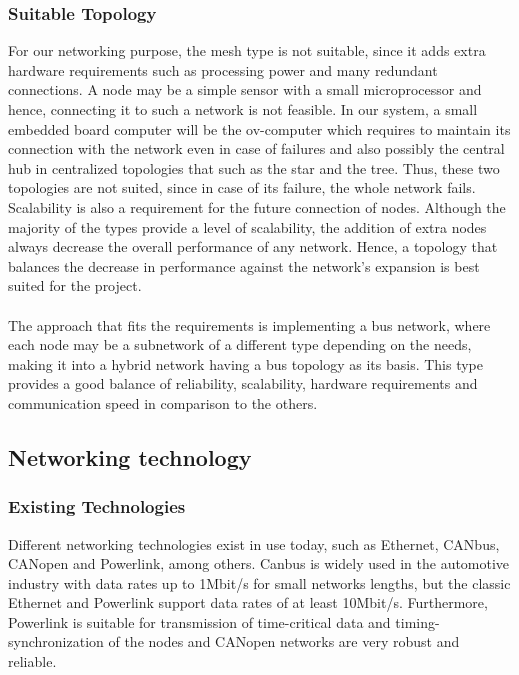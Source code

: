 \subsubsection{Suitable Topology}
For our networking purpose, the mesh type is not suitable, since it adds extra hardware requirements such as processing power and many redundant connections. A node may be a simple sensor with a small microprocessor and hence, connecting it to such a network is not feasible. In our system, a small embedded board computer will be the ov-computer which requires to maintain its connection with the network even in case of failures and also possibly the central hub in centralized topologies that such as the star and the tree. Thus, these two topologies are not suited, since in case of its failure, the whole network fails. Scalability is also a requirement for the future connection of nodes. Although the majority of the types provide a level of scalability, the addition of extra nodes always decrease the overall performance of any network. Hence, a topology that balances the decrease in performance against the network's expansion is best suited for the project.\\\\
The approach that fits the requirements is implementing a bus network, where each node may be a subnetwork of a different type depending on the needs, making it into a hybrid network having a bus topology as its basis. This type provides a good balance of reliability, scalability, hardware requirements and communication speed in comparison to the others.

\subsection{Networking technology}

\subsubsection{Existing Technologies}
Different networking technologies exist in use today, such as Ethernet, CANbus, CANopen and Powerlink, among others. Canbus is widely used in the automotive industry with data rates up to 1Mbit/s for small networks lengths, but the classic Ethernet and Powerlink support data rates of at least 10Mbit/s. Furthermore, Powerlink is suitable for transmission of time-critical data and timing-synchronization of the nodes and CANopen networks are very robust and reliable.
